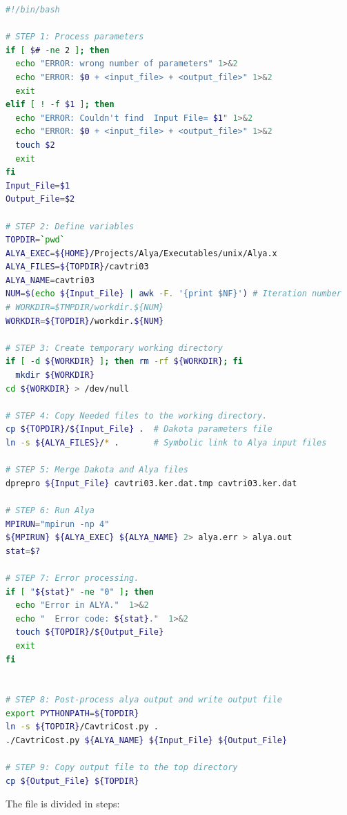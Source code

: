 \documentclass[12pt,a4paper,article]{memoir}
\begin{document}
\begin{lstlisting}[style=MyCodeStyle,language=bash]
#!/bin/bash

# STEP 1: Process parameters
if [ $# -ne 2 ]; then
  echo "ERROR: wrong number of parameters" 1>&2
  echo "ERROR: $0 + <input_file> + <output_file>" 1>&2
  exit
elif [ ! -f $1 ]; then
  echo "ERROR: Couldn't find  Input File= $1" 1>&2
  echo "ERROR: $0 + <input_file> + <output_file>" 1>&2
  touch $2
  exit 
fi
Input_File=$1
Output_File=$2

# STEP 2: Define variables
TOPDIR=`pwd`
ALYA_EXEC=${HOME}/Projects/Alya/Executables/unix/Alya.x
ALYA_FILES=${TOPDIR}/cavtri03
ALYA_NAME=cavtri03
NUM=$(echo ${Input_File} | awk -F. '{print $NF}') # Iteration number
# WORKDIR=$TMPDIR/workdir.${NUM}
WORKDIR=${TOPDIR}/workdir.${NUM}

# STEP 3: Create temporary working directory
if [ -d ${WORKDIR} ]; then rm -rf ${WORKDIR}; fi
  mkdir ${WORKDIR}
cd ${WORKDIR} > /dev/null

# STEP 4: Copy Needed files to the working directory.
cp ${TOPDIR}/${Input_File} .  # Dakota parameters file
ln -s ${ALYA_FILES}/* .       # Symbolic link to Alya input files

# STEP 5: Merge Dakota and Alya files
dprepro ${Input_File} cavtri03.ker.dat.tmp cavtri03.ker.dat

# STEP 6: Run Alya
MPIRUN="mpirun -np 4"
${MPIRUN} ${ALYA_EXEC} ${ALYA_NAME} 2> alya.err > alya.out
stat=$?

# STEP 7: Error processing.
if [ "${stat}" -ne "0" ]; then
  echo "Error in ALYA."  1>&2
  echo "  Error code: ${stat}."  1>&2
  touch ${TOPDIR}/${Output_File}
  exit
fi


# STEP 8: Post-process alya output and write output file
export PYTHONPATH=${TOPDIR}
ln -s ${TOPDIR}/CavtriCost.py .
./CavtriCost.py ${ALYA_NAME} ${Input_File} ${Output_File}

# STEP 9: Copy output file to the top directory
cp ${Output_File} ${TOPDIR}
\end{lstlisting}

The file is divided in steps:
\end{document}
